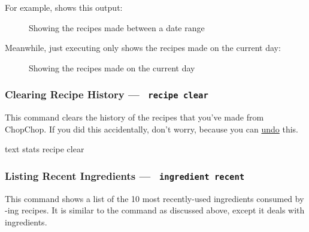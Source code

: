 	For example,  shows this output:

	\begin{figure}[!htbp]\centering\ContinuedFloat*
		\caption{Showing the recipes made between a date range}
	\end{figure}

	\pagebreak
	Meanwhile, just executing  only shows the recipes made on the current day:

	\begin{figure}[!htbp]\centering\ContinuedFloat
		\caption{Showing the recipes made on the current day}
	\end{figure}










\hypertarget{StatsRecipeClearCommand}{}
\subsubsection{Clearing Recipe History — \texttt{ recipe clear}}

	This command clears the history of the recipes that you've made from ChopChop. If you did this accidentally, don't worry,
	because you can \hyperlink{UndoCommand}{undo} this.

	 \begin{blockofcode}{text}
		stats recipe clear
	\end{blockofcode}




\pagebreak
\hypertarget{StatsIngredientRecentCommand}{}
\subsubsection{Listing Recent Ingredients — \texttt{ ingredient recent}}

	This command shows a list of the 10 most recently-used ingredients consumed by \hyperlink{MakeRecipeCommand}{}-ing recipes.
	It is similar to the \hyperlink{StatsRecipeRecentCommand}{} command as discussed above, except it deals
	with ingredients.

